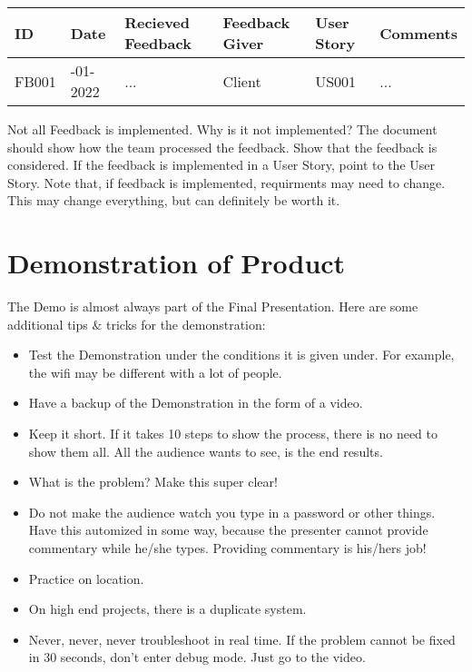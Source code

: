 \documentclass[10pt]{report}
\begin{document}
\medskip
\begin{tabularx}{0.8\textwidth} { 
  | >{\raggedright\arraybackslash}X 
  | >{\raggedright\arraybackslash}X 
  | >{\raggedright\arraybackslash}X 
  | >{\raggedright\arraybackslash}X 
  | >{\raggedright\arraybackslash}X 
  | >{\raggedright\arraybackslash}X | }
 \hline
 ID & Date & Recieved Feedback & Feedback Giver & User Story & Comments \\
 \hline
 FB001 & 01-01-2022 & ... & Client & US001 & ... \\
 \hline
\end{tabularx}
\medskip

\noindent Not all Feedback is implemented. Why is it not implemented? The document should show how the team processed the feedback. Show that the feedback is considered. If the feedback is implemented in a User Story, point to the User Story. Note that, if feedback is implemented, requirments may need to change. This may change everything, but can definitely be worth it.

\newpage

\section{Demonstration of Product}

The Demo is almost always part of the Final Presentation. Here are some additional tips \& tricks for the demonstration:

\begin{itemize}
	\item Test the Demonstration under the conditions it is given under. For example, the wifi may be different with a lot of people.
	\item Have a backup of the Demonstration in the form of a video.
	\item Keep it short. If it takes 10 steps to show the process, there is no need to show them all. All the audience wants to see, is the end results.
	\item What is the problem? Make this super clear!
	\item Do not make the audience watch you type in a password or other things. Have this automized in some way, because the presenter cannot provide commentary while he/she types. Providing commentary is his/hers job!
	\item Practice on location.
	\item On high end projects, there is a duplicate system.
	\item Never, never, never troubleshoot in real time. If the problem cannot be fixed in 30 seconds, don't enter debug mode. Just go to the video.
\end{itemize}
\end{document}
